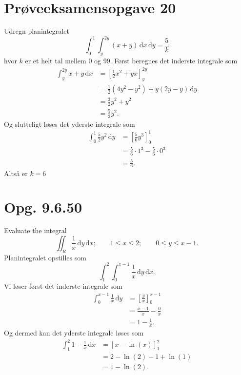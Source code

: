 \documentclass[12pt]{article}
\theoremstyle{definition}
\begin{document}
\section*{Prøveeksamensopgave 20}
Udregn planintegralet
\[ 
\int_{0}^{1} \int_{y}^{2y} (x+y) \, \mathrm{d}x \, \mathrm{d}y = \frac{5}{k}
\]
hvor $k$ er et helt tal mellem 0 og 99.
\bigbreak
Først beregnes det inderste integrale som
\begin{align*}
  \int_{y}^{2y} x+y \, \mathrm{d}x &= \left[ \frac{1}{2}x^2 + yx \right]_{y}^{2y}  \\
  &= \frac{1}{2} \left( 4y^2 - y^2 \right) + y \left( 2y - y \right) \, \mathrm{d}y  \\
  &= \frac{3}{2} y^2 + y^2 \\
  &= \frac{5}{2}y^2
.\end{align*}
Og slutteligt løses det yderste integrale som
\begin{align*}
  \int_{0}^{1} \frac{5}{2}y^2 \, \mathrm{d}y &= \left[ \frac{5}{6}y^{3} \right]_0^{1} \\
  &= \frac{5}{6}\cdot 1^{3} - \frac{5}{6}\cdot 0^{3} \\
  &= \frac{5}{6}
.\end{align*}
Altså er $k = 6$


\section*{Opg. 9.6.50}
Evaluate the integral
\[ 
\iint_{R} \frac{1}{x} \, \mathrm{d}y \, \mathrm{d}x; \qquad 1 \leq x \leq 2; \qquad 0 \leq y \leq x-1
.\]
\bigbreak
Planintegralet opstilles som
\[ 
\int_{1}^{2} \int_{0}^{x-1} \frac{1}{x} \, \mathrm{d}y \, \mathrm{d}x 
.\]
Vi løser først det inderste integrale som
\begin{align*}
  \int_{0}^{x-1} \frac{1}{x} \, \mathrm{d}y &= \left[ \frac{y}{x} \right]_0^{x-1} \\
  &= \frac{x-1}{x} - \frac{0}{x} \\
  &= 1 - \frac{1}{x}
.\end{align*}
Og dermed kan det yderste integrale løses som
\begin{align*}
  \int_{1}^{2} 1 - \frac{1}{x} \, \mathrm{d}x &= \left[ x - \ln(x) \right]_1^2  \\
  &= 2 - \ln(2) - 1 + \ln(1) \\
  &= 1 - \ln(2)
.\end{align*}
\end{document}
